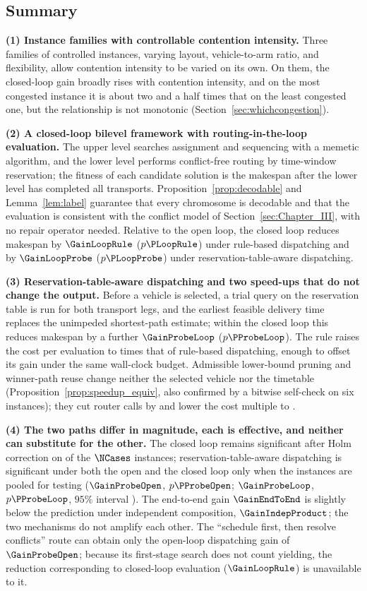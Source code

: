 \subsection{Summary}
\label{sec:contributions}

\textbf{(1) Instance families with controllable contention intensity.}
Three families of controlled instances, varying layout, vehicle-to-arm ratio, and flexibility, allow contention intensity to be varied on its own. On them, the closed-loop gain broadly rises with contention intensity, and on the most congested instance it is about two and a half times that on the least congested one, but the relationship is not monotonic (Section~\ref{sec:whichcongestion}).

\textbf{(2) A closed-loop bilevel framework with routing-in-the-loop evaluation.}
The upper level searches assignment and sequencing with a memetic algorithm, and the lower level performs conflict-free routing by time-window reservation; the fitness of each candidate solution is the makespan after the lower level has completed all transports.
Proposition~\ref{prop:decodable} and Lemma~\ref{lem:label} guarantee that every chromosome is decodable and that the evaluation is consistent with the conflict model of Section~\ref{sec:Chapter_III}, with no repair operator needed.
Relative to the open loop, the closed loop reduces makespan by $\GainLoopRule$ ($p\PLoopRule$) under rule-based dispatching and by $\GainLoopProbe$ ($p\PLoopProbe$) under reservation-table-aware dispatching.

\textbf{(3) Reservation-table-aware dispatching and two speed-ups that do not change the output.}
Before a vehicle is selected, a trial query on the reservation table is run for both transport legs, and the earliest feasible delivery time replaces the unimpeded shortest-path estimate; within the closed loop this reduces makespan by a further $\GainProbeLoop$ ($p\PProbeLoop$).
The rule raises the cost per evaluation to \CostMultBefore{} times that of rule-based dispatching, enough to offset its gain under the same wall-clock budget. Admissible lower-bound pruning and winner-path reuse change neither the selected vehicle nor the timetable (Proposition~\ref{prop:speedup_equiv}, also confirmed by a bitwise self-check on six instances); they cut router calls by \RouteCallCut{} and lower the cost multiple to \CostMultAfter{}.

\textbf{(4) The two paths differ in magnitude, each is effective, and neither can substitute for the other.}
The closed loop remains significant after Holm correction on \CellsSigLoopAdj{} of the $\NCases$ instances; reservation-table-aware dispatching is significant under both the open and the closed loop only when the instances are pooled for testing ($\GainProbeOpen$, $p\PProbeOpen$; $\GainProbeLoop$, $p\PProbeLoop$, $95\%$ interval \CIProbeLoop{}).
The end-to-end gain $\GainEndToEnd$ is slightly below the prediction under independent composition, $\GainIndepProduct$; the two mechanisms do not amplify each other.
The ``schedule first, then resolve conflicts'' route can obtain only the open-loop dispatching gain of $\GainProbeOpen$; because its first-stage search does not count yielding, the reduction corresponding to closed-loop evaluation ($\GainLoopRule$) is unavailable to it.


